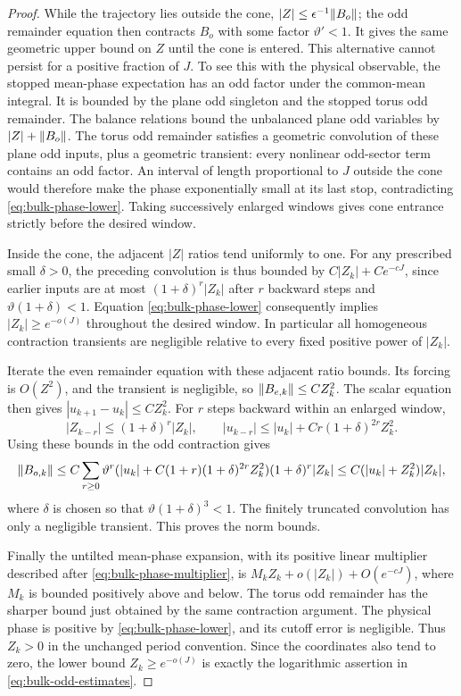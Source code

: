 \begin{proof}
While the trajectory lies outside the cone,
$|Z|\le\epsilon^{-1}\lVert B_o\rVert$; the odd remainder equation
then contracts $B_o$ with some factor $\vartheta'<1$.  It gives
the same geometric upper bound on $Z$ until the cone is entered.
This alternative cannot persist for a positive fraction of $J$.
To see this with the physical observable, the stopped mean-phase
expectation has an odd factor under the common-mean integral.
It is bounded by the plane odd singleton and the stopped torus
odd remainder.  The balance relations bound the unbalanced
plane odd variables by $|Z|+\lVert B_o\rVert$.  The torus odd remainder
satisfies a geometric convolution of these plane odd inputs,
plus a geometric transient: every nonlinear odd-sector term
contains an odd factor.  An interval of length proportional to
$J$ outside the cone would therefore make the phase exponentially
small at its last stop, contradicting
\eqref{eq:bulk-phase-lower}.  Taking successively enlarged
windows gives cone entrance strictly before the desired window.

Inside the cone, the adjacent $|Z|$ ratios tend uniformly to one.
For any prescribed small $\delta>0$, the preceding convolution
is thus bounded by $C|Z_k|+Ce^{-cJ}$, since earlier inputs are
at most $(1+\delta)^r|Z_k|$ after $r$ backward steps and
$\vartheta(1+\delta)<1$.  Equation
\eqref{eq:bulk-phase-lower} consequently implies
$|Z_k|\ge e^{-o(J)}$ throughout the desired window.  In
particular all homogeneous contraction transients are negligible
relative to every fixed positive power of $|Z_k|$.

Iterate the even remainder equation with these adjacent ratio
bounds.  Its forcing is $O(Z^2)$, and the transient is negligible,
so $\lVert B_{e,k}\rVert\le C Z_k^2$.  The scalar equation then gives
$|u_{k+1}-u_k|\le CZ_k^2$.  For $r$ steps backward within an
enlarged window,
\begin{equation}\label{eq:bulk-backward-u}
 |Z_{k-r}|\le(1+\delta)^r|Z_k|,\qquad
 |u_{k-r}|\le |u_k|+Cr(1+\delta)^{2r}Z_k^2.
\end{equation}
Using these bounds in the odd contraction gives
\[
 \lVert B_{o,k}\rVert
 \le C\sum_{r\ge0}\vartheta^r
 (|u_k|+C(1+r)(1+\delta)^{2r}Z_k^2)
 (1+\delta)^r|Z_k|
 \le C(|u_k|+Z_k^2)|Z_k|,
\]
where $\delta$ is chosen so that
$\vartheta(1+\delta)^3<1$.  The finitely truncated convolution
has only a negligible transient.  This proves the norm bounds.

Finally the untilted mean-phase expansion, with its positive
linear multiplier described after
\eqref{eq:bulk-phase-multiplier}, is
$M_kZ_k+o(|Z_k|)+O(e^{-cJ})$, where $M_k$ is bounded positively
above and below.  The torus odd remainder has the sharper bound
just obtained by the same contraction argument.  The physical
phase is positive by \eqref{eq:bulk-phase-lower}, and its
cutoff error is negligible.  Thus $Z_k>0$ in the unchanged period
convention.  Since the coordinates also tend to zero, the
lower bound $Z_k\ge e^{-o(J)}$ is exactly the logarithmic
assertion in \eqref{eq:bulk-odd-estimates}.
\end{proof}


